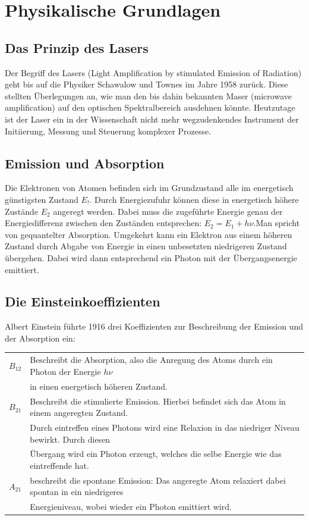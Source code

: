 \section{Physikalische Grundlagen}

\subsection{Das Prinzip des Lasers}
Der Begriff des Lasers (Light Amplification by stimulated Emission of Radiation) geht bis auf die  Physiker Schawalow und Townes im Jahre  1958 zurück. Diese stellten Überlegungen an, wie man den bis dahin  bekannten Maser (microwave amplification) auf den optischen Spektralbereich ausdehnen könnte. Heutzutage ist der Laser ein in der  Wissenschaft nicht mehr wegzudenkendes Instrument der Initiierung,  Messung und Steuerung komplexer Prozesse.

\subsection{Emission und Absorption}
Die Elektronen von Atomen befinden sich im Grundzustand alle im energetisch günstigsten Zustand $E_!$. Durch  Energiezufuhr können diese  in energetisch höhere Zustände $E_2$ angeregt werden. Dabei muss die zugeführte Energie genau der Energiedifferenz zwischen den Zuständen entsprechen: $E_2 = E_1 +h\nu$.Man spricht  von gequantelter Absorption. Umgekehrt kann ein Elektron aus einem höheren Zustand durch  Abgabe von Energie in einen unbesetzten niedrigeren Zustand übergehen.  Dabei wird  dann entsprechend  ein Photon mit der Übergangsenergie emittiert.

\subsection{Die Einsteinkoeffizienten}
Albert Einstein führte 1916 drei Koeffizienten zur Beschreibung der Emission und der Absorption ein:

\begin{tabular}{l l}
$B_{12}$ & Beschreibt die Absorption, also die Anregung des Atoms durch ein Photon der Energie $h\nu$ \\
& in einen energetisch höheren Zustand.\\
$B_{21}$ & Beschreibt die stimulierte Emission. Hierbei befindet sich das Atom in einem angeregten Zustand. \\
& Durch eintreffen eines Photons wird eine Relaxion in das niedriger Niveau bewirkt. Durch diesen\\
&  Übergang wird ein Photon erzeugt, welches die selbe Energie wie das eintreffende hat.\\
$A_{21}$ & beschreibt die spontane Emission: Das angeregte Atom relaxiert dabei spontan in ein niedrigeres\\
& Energieniveau, wobei wieder  ein Photon emittiert wird.
\end{tabular}

